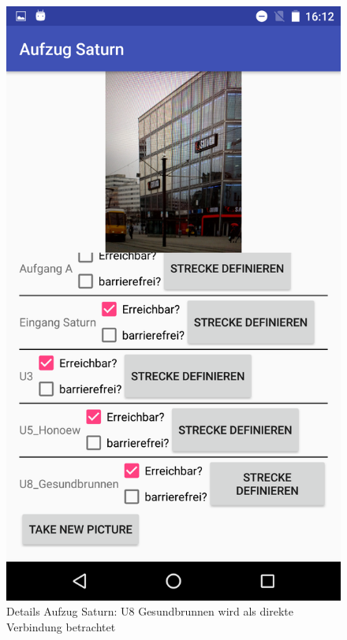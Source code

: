 \documentclass{article}
\begin{document}
\begin{figure}[H]
	\centering
	\includegraphics[scale=0.18]{images/poi_aufzug_saturn_details_reflect.png}
	\caption{Details Aufzug Saturn: U8 Gesundbrunnen wird als direkte Verbindung betrachtet}
	\label{fig:poi_aufzug_saturn_details_reflect}
\end{figure}
\end{document}
